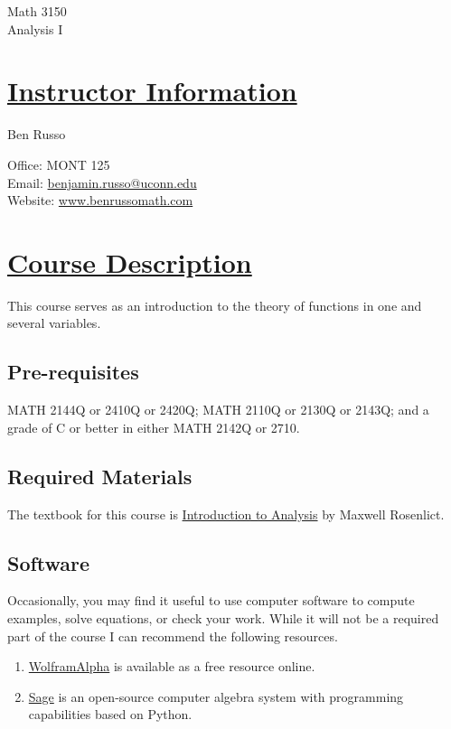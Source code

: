 \documentclass[11pt]{article}
\begin{document}
\begin{center}
{\LARGE Math 3150}\\
Analysis I\\
\end{center}

\section*{\underline{Instructor Information}}
Ben Russo

\noindent 
Office: MONT 125\\
Email:  \href{mailto:benjamin.russo@uconn.edu}{benjamin.russo@uconn.edu}\\
Website: \href{http://www.benrussomath.com}{www.benrussomath.com}
\section*{\underline{Course Description}}
This course serves as an introduction to the theory of functions in one and several variables.
\subsection*{Pre-requisites}
MATH 2144Q or 2410Q or 2420Q; MATH 2110Q or 2130Q or 2143Q; and a grade of C or better in either MATH 2142Q or 2710.
\subsection*{Required Materials}
The textbook for this course is \href{https://www.amazon.com/Introduction-Analysis-Dover-Books-Mathematics/dp/0486650383/}{Introduction to Analysis} by Maxwell Rosenlict.

\subsection*{Software}
Occasionally, you may find it useful to use computer software to compute examples, solve equations, or check your work. While it will not be a required part of the course I can recommend the following resources. 
\begin{enumerate}[$\bullet$]
\item \href{www.wolframalpha.com}{WolframAlpha} is available as a free resource online.
\item \href{http://www.sagemath.org/}{Sage} is an open-source computer algebra system with programming capabilities based on Python. 
\end{enumerate}
\end{document}
